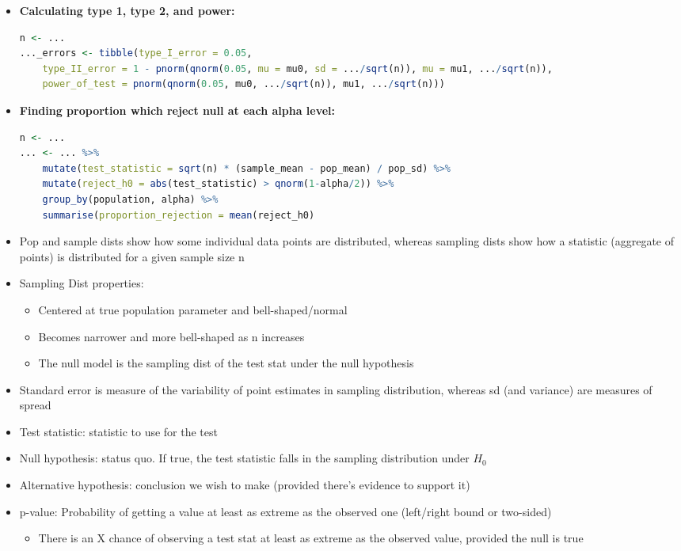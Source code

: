 \documentclass[8pt,landscape,a4paper, fleqn, dvipsnames]{extarticle}
\begin{document}
\begin{multicols*}{4}
\begin{itemize}
\begin{itemize}
        \item \textbf{Calculating type 1, type 2, and power:}
        \begin{lstlisting}[language = R]
n <- ...
..._errors <- tibble(type_I_error = 0.05,
    type_II_error = 1 - pnorm(qnorm(0.05, mu = mu0, sd = .../sqrt(n)), mu = mu1, .../sqrt(n)), 
    power_of_test = pnorm(qnorm(0.05, mu0, .../sqrt(n)), mu1, .../sqrt(n)))
        \end{lstlisting}
        \item \textbf{Finding proportion which reject null at each alpha level:}
        \begin{lstlisting}[language = R]
n <- ...
... <- ... %>% 
    mutate(test_statistic = sqrt(n) * (sample_mean - pop_mean) / pop_sd) %>% 
    mutate(reject_h0 = abs(test_statistic) > qnorm(1-alpha/2)) %>% 
    group_by(population, alpha) %>% 
    summarise(proportion_rejection = mean(reject_h0)
        \end{lstlisting}
    \item Pop and sample dists show how some individual data points are distributed, whereas sampling dists show how a statistic (aggregate of points) is distributed for a given sample size n
    \item Sampling Dist properties:
    \begin{itemize}
        \item Centered at true population parameter and bell-shaped/normal
        \item Becomes narrower and more bell-shaped as n increases
        \item The null model is the sampling dist of the test stat under the null hypothesis
    \end{itemize}
    \item Standard error is measure of the variability of point estimates in sampling distribution, whereas sd (and variance) are measures of spread
    \item Test statistic: statistic to use for the test
    \item Null hypothesis: status quo. If true, the test statistic falls in the sampling distribution under $H_0$
    \item Alternative hypothesis: conclusion we wish to make (provided there's evidence to support it)
    \item p-value: Probability of getting a value at least as extreme as the observed one (left/right bound or two-sided)
    \begin{itemize}
        \item There is an X chance of observing a test stat at least as extreme as the observed value, provided the null is true

\end{itemize}
\end{itemize}
\end{itemize}
\end{multicols*}
\end{document}
